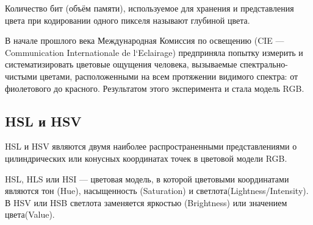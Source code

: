 Количество бит (объём памяти), используемое для хранения и представления цвета при кодировании одного пикселя называют глубиной цвета. 

В начале прошлого века Международная Комиссия по освещению (CIE —
Communication Internationale de l`Eclairage) предприняла попытку  измерить и систематизировать цветовые ощущения человека, вызываемые спектрально-чистыми
цветами, расположенными на всем протяжении видимого спектра: от фиолетового до
красного. Результатом этого эксперимента и стала модель RGB. 

\begin{figure}[ht!]
\end{figure}

\subsection{HSL и HSV}
HSL и HSV являются двумя наиболее распространенными представлениями о цилиндрических или конусных координатах точек в цветовой модели RGB. 

HSL, HLS или HSI  — цветовая модель, в которой цветовыми координатами являются тон (Hue), насыщенность (Saturation) и светлота(Lightness/Intensity). В HSV или HSB светлота заменяется яркостью (Brightness) или значением цвета(Value).

